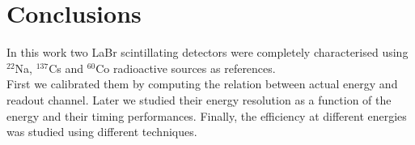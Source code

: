 \section{Conclusions}
\label{sec:conclusions}

 In this work two LaBr scintillating detectors were completely characterised using $^{22}$Na, $^{137}$Cs and $^{60}$Co radioactive sources as references. \\
 First we calibrated them by computing the relation between actual energy and readout channel. Later we studied their energy resolution as a function of the energy and their timing performances. Finally, the efficiency at different energies was studied using different techniques.
